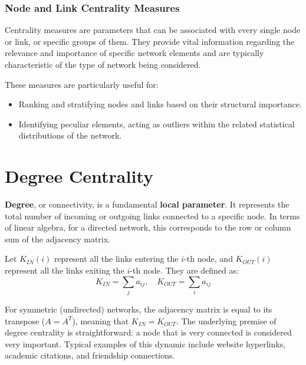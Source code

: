 \subsubsection{Node and Link Centrality Measures}
Centrality measures are parameters that can be associated with every single node or link, or specific groups of them. They provide vital information regarding the relevance and importance of specific network elements and are typically characteristic of the type of network being considered.

These measures are particularly useful for:
\begin{itemize}
    \item Ranking and stratifying nodes and links based on their structural importance.
    \item Identifying peculiar elements, acting as outliers within the related statistical distributions of the network.
\end{itemize}

\section{Degree Centrality}

\textbf{Degree}, or connectivity, is a fundamental \textbf{local parameter}. It represents the total number of incoming or outgoing links connected to a specific node. In terms of linear algebra, for a directed network, this corresponds to the row or column sum of the adjacency matrix.

\begin{definition}[Degree]
    Let $K_{IN}(i)$ represent all the links entering the $i$-th node, and $K_{OUT}(i)$ represent all the links exiting the $i$-th node. They are defined as:
    \[ K_{IN} = \sum_{j} a_{ij}, \quad K_{OUT} = \sum_{i} a_{ij} \]
\end{definition}

For symmetric (undirected) networks, the adjacency matrix is equal to its transpose ($A = A^T$), meaning that $K_{IN} = K_{OUT}$. The underlying premise of degree centrality is straightforward: a node that is very connected is considered very important. Typical examples of this dynamic include website hyperlinks, academic citations, and friendship connections.

